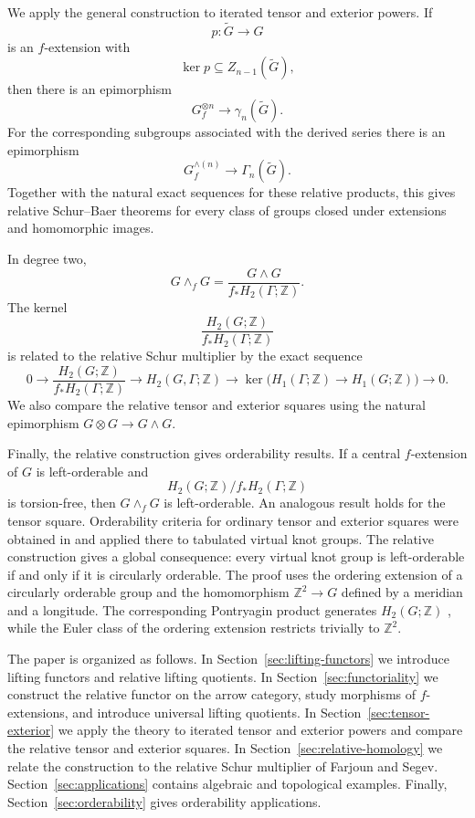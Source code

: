 \documentclass[10pt]{amsart}
\renewcommand{\*}{\cdot {\dots} \cdot}
\newcommand{\?}[1]{\overset{?}{#1}}
\numberwithin{equation}{section}
\begin{document}
We apply the general construction to iterated tensor and exterior
powers. If
\[
p\colon\widetilde G\longrightarrow G
\]
is an $f$-extension with
\[
\ker p\subseteq Z_{n-1}(\widetilde G),
\]
then there is an epimorphism
\[
G_f^{\otimes n}\longrightarrow\gamma_n(\widetilde G).
\]
For the corresponding subgroups associated with the derived
series there is an epimorphism
\[
G_f^{\wedge(n)}\longrightarrow\Gamma_n(\widetilde G).
\]
Together with the natural exact sequences for these relative
products, this gives relative Schur--Baer theorems for every class
of groups closed under extensions and homomorphic images.

In degree two,
\[
G\wedge_fG=
\frac{G\wedge G}{f_*H_2(\Gamma;\mathbb Z)}.
\]
The kernel
\[
\frac{H_2(G;\mathbb Z)}{f_*H_2(\Gamma;\mathbb Z)}
\]
is related to the relative Schur multiplier by the exact sequence
\[
0\longrightarrow
\frac{H_2(G;\mathbb Z)}{f_*H_2(\Gamma;\mathbb Z)}
\longrightarrow H_2(G,\Gamma;\mathbb Z)
\longrightarrow
\ker\bigl(H_1(\Gamma;\mathbb Z)\to H_1(G;\mathbb Z)\bigr)
\longrightarrow0.
\]
We also compare the relative tensor and exterior squares using the
natural epimorphism $G\otimes G\to G\wedge G$.

Finally, the relative construction gives orderability results. If
a central $f$-extension of $G$ is left-orderable and
\[
H_2(G;\mathbb Z)/f_*H_2(\Gamma;\mathbb Z)
\]
is torsion-free, then $G\wedge_fG$ is left-orderable. An analogous
result holds for the tensor square. Orderability criteria for
ordinary tensor and exterior squares were obtained in
\cite{Ivanov2024} and applied there to tabulated virtual knot
groups. The relative construction gives a global consequence: every virtual knot group is left-orderable if and
only if it is circularly orderable. The proof uses the ordering extension of a
circularly orderable group and the homomorphism
$\mathbb Z^2\to G$ defined by a meridian and a longitude. The
corresponding Pontryagin product generates $H_2(G;\mathbb Z)$
\cite{Kim2000}, while the Euler class of the ordering extension
restricts trivially to $\mathbb Z^2$.

The paper is organized as follows. In
Section~\ref{sec:lifting-functors} we introduce lifting functors
and relative lifting quotients. In Section~\ref{sec:functoriality}
we construct the relative functor on the arrow category, study
morphisms of $f$-extensions, and introduce universal lifting
quotients. In Section~\ref{sec:tensor-exterior} we apply the theory to
iterated tensor and exterior powers and compare the relative
tensor and exterior squares. In Section~\ref{sec:relative-homology}
we relate the construction to the relative Schur multiplier of
Farjoun and Segev. Section~\ref{sec:applications} contains
algebraic and topological examples. Finally,
Section~\ref{sec:orderability} gives orderability applications.
\end{document}
